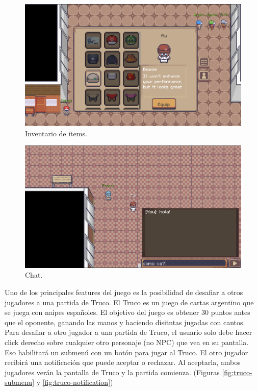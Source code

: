\begin{figure}[htbp]
    \centering
    \includegraphics[width=1.0\textwidth]{../assets/godot-inventory.png}
    \caption{Inventario de items.}
    \label{fig:inventory}
\end{figure}

\begin{figure}[htbp]
    \centering
    \includegraphics[width=1.0\textwidth]{../assets/godot-chat.png}
    \caption{Chat.}
    \label{fig:chat}
\end{figure}

Uno de los principales features del juego es la posibilidad de desafiar a otros jugadores a una partida de 
Truco. El Truco es un juego de cartas argentino que se juega con naipes españoles. El objetivo del juego
es obtener 30 puntos antes que el oponente, ganando las manos y haciendo disitntas jugadas con cantos.
Para desafiar a otro jugador a una partida de Truco, el usuario solo debe hacer click derecho sobre cualquier
otro personaje (no NPC) que vea en su pantalla. Eso habilitará un submenú con un botón para jugar al Truco.
El otro jugador recibirá una notificación que puede aceptar o rechazar. Al aceptarla, ambos jugadores
verán la pantalla de Truco y la partida comienza. (Figuras \ref{fig:truco-submenu} y \ref{fig:truco-notification})

